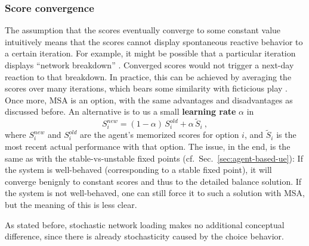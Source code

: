 \subsubsection{Score convergence}
\label{sec:score-convergence}

The assumption that the scores
eventually converge to
some constant value intuitively means that the scores cannot display
spontaneous reactive behavior to a certain iteration.  For example, it
might be possible that a particular iteration displays ``network
breakdown'' \citep{RieserNagel2008NetworkBreakdown}.  Converged scores
would not trigger a next-day reaction to that breakdown.  In practice,
this can be achieved by averaging the scores over many iterations,
which bears some similarity with ficticious play 
\citep{monderer-1996, garcia-2000}.
Once more, MSA is an option, with the same advantages and
disadvantages as discussed before.  An alternative is to us a small
\textbf{learning rate} $\alpha$ in
\begin{equation}
S_i^{new} = (1-\alpha) \, S_i^{old} + \alpha \, \tilde S_i \ ,
\end{equation}
where $S_i^{new}$ and $S_i^{old}$ are the agent's memorized scores for
option $i$, and $\tilde S_i$ is the most recent actual performance
with that option.  The issue, in the end, is the same as with the
stable-vs-unstable fixed points (cf.~Sec.~\ref{sec:agent-based-ue}):
If the system is well-behaved (corresponding to a stable fixed point),
it will converge benignly to constant scores and thus to the detailed
balance solution.  If the system is not well-behaved, one can still
force it to such a solution with MSA, but the meaning of this is less
clear.

As stated before, stochastic network loading makes no additional
conceptual difference, since there is already stochasticity caused by
the choice behavior.


